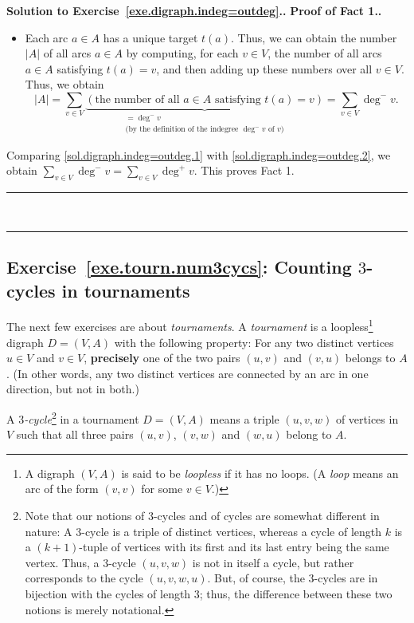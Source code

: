 \documentclass[numbers=enddot,12pt,final,onecolumn,notitlepage]{scrartcl}%
\newcounter{exer}
\theoremstyle{definition}
\newenvironment{proof}[1][Proof]{\noindent\textbf{#1.} }{\ \rule{0.5em}{0.5em}}
\let\sumnonlimits\sum
\renewcommand{\sum}{\sumnonlimits\limits}
\newcommand{\abs}[1]{\left| #1 \right|}
\newcommand{\tup}[1]{\left( #1 \right)}
\begin{document}
\begin{proof}[Solution to Exercise~\ref{exe.digraph.indeg=outdeg}.]
\begin{proof}[Proof of Fact 1.]
\begin{itemize}
\item Each arc $a \in A$ has a unique target $t \tup{a}$. Thus, we can
obtain the number $\abs{A}$ of all arcs $a \in A$ by computing,
for each $v \in V$, the number of all arcs $a \in A$ satisfying
$t \tup{a} = v$, and then adding up these
numbers over all $v \in V$. Thus, we obtain
\begin{equation}
\abs{A}
= \sum_{v \in V}
  \underbrace{\left(\text{the number of all } a \in A
                \text{ satisfying } t \tup{a} = v \right)}_{
              \substack{= \deg^- v \\
                \text{(by the definition of the indegree } \deg^- v
                \text{ of } v \text{})}}
= \sum_{v \in V} \deg^- v .
\label{sol.digraph.indeg=outdeg.1}
\end{equation}
\end{itemize}

Comparing \eqref{sol.digraph.indeg=outdeg.1} with
\eqref{sol.digraph.indeg=outdeg.2}, we obtain
$\sum_{v \in V} \deg^- v = \sum_{v \in V} \deg^+ v$.
This proves Fact 1.
\end{proof}
\end{proof}

\subsection{Exercise~\ref{exe.tourn.num3cycs}: Counting $3$-cycles in
tournaments}

The next few exercises are about \textit{tournaments}. A
\textit{tournament} is a loopless\footnote{A digraph $\tup{V, A}$ is
said to be \textit{loopless} if it has no loops. (A \textit{loop}
means an arc of the form $\tup{v, v}$ for some $v \in V$.)} digraph
$D = \tup{V, A}$ with the following
property: For any two distinct vertices $u \in V$ and $v \in V$,
\textbf{precisely} one of the two pairs $\tup{u, v}$ and $\tup{v, u}$
belongs to $A$. (In other words, any two distinct vertices are
connected by an arc in one direction, but not in both.)

A \textit{$3$-cycle}\footnote{Note that our
notions of $3$-cycles and of cycles are somewhat different in nature:
A $3$-cycle is a triple of distinct vertices, whereas a cycle of
length $k$ is a $\tup{k+1}$-tuple of vertices with its first and its
last entry being the same vertex. Thus, a $3$-cycle $\tup{u, v, w}$ is
not in itself a cycle, but rather corresponds to the cycle
$\tup{u, v, w, u}$. But, of course, the $3$-cycles are in bijection
with the cycles of length $3$; thus, the difference between these two
notions is merely notational.} in a tournament $D = \tup{V, A}$ means
a triple $\tup{u, v, w}$ of vertices in $V$ such that all three pairs
$\tup{u, v}$, $\tup{v, w}$ and $\tup{w, u}$ belong to $A$.
\end{document}
